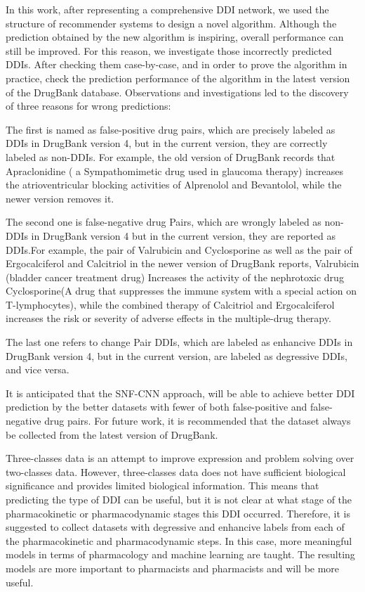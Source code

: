 \documentclass{bmcart}
\begin{document}
In this work, after representing a comprehensive DDI network, we used the structure of recommender systems to design a novel algorithm. Although the prediction obtained by the new algorithm is inspiring, overall performance can still be improved. For this reason, we investigate those incorrectly predicted DDIs. After checking them case-by-case, and in order to prove the algorithm in practice, check the prediction performance of the algorithm in the latest version of the DrugBank database. Observations and investigations led to the discovery of three reasons for wrong predictions:

The first is named as false-positive drug pairs, which are precisely labeled as DDIs in DrugBank version 4, but in the current version, they are correctly labeled as non-DDIs. For example, the old version of DrugBank records that Apraclonidine ( a Sympathomimetic drug used in glaucoma therapy) increases the atrioventricular blocking activities of Alprenolol and Bevantolol, while the newer version removes it.

The second one is false-negative drug Pairs, which are wrongly labeled as non-DDIs in DrugBank version 4  but in the current version, they are reported as DDIs.For example, the pair of Valrubicin and Cyclosporine as well as the pair of Ergocalciferol and  Calcitriol in the newer version of DrugBank reports, Valrubicin (bladder cancer treatment drug) Increases the activity of the nephrotoxic drug Cyclosporine(A drug that suppresses the immune system with a special action on T-lymphocytes), while the combined therapy of Calcitriol and Ergocalciferol increases the risk or severity of adverse effects in the multiple-drug therapy.

The last one refers to change Pair DDIs, which are labeled as enhancive DDIs in DrugBank version 4, but in the current version, are labeled as degressive DDIs, and vice versa.

It is anticipated that the SNF-CNN approach, will be able to achieve better DDI prediction by the better datasets with fewer of both false-positive and false-negative drug pairs. For future work, it is recommended that the dataset always be collected from the latest version of DrugBank.

Three-classes data is an attempt to improve expression and problem solving over two-classes data. However, three-classes data does not have sufficient biological significance and provides limited biological information. This means that predicting the type of DDI can be useful, but it is not clear at what stage of the pharmacokinetic or pharmacodynamic stages this DDI occurred. Therefore, it is suggested to collect datasets with degressive and enhancive labels from each of the pharmacokinetic and pharmacodynamic steps. In this case, more meaningful models in terms of pharmacology and machine learning are taught. The resulting models are more important to pharmacists and pharmacists and will be more useful.
\end{document}
